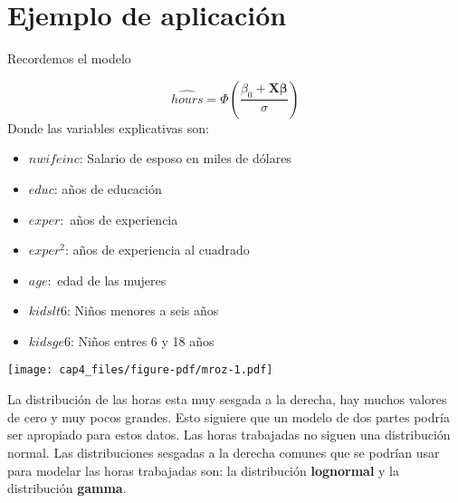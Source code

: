 \documentclass[
  letterpaper,
  DIV=11,
  numbers=noendperiod]{scrreprt}
\newenvironment{Shaded}{\begin{snugshade}}{\end{snugshade}}
\newcommand{\AttributeTok}[1]{\textcolor[rgb]{0.40,0.45,0.13}{#1}}
\newcommand{\CommentTok}[1]{\textcolor[rgb]{0.37,0.37,0.37}{#1}}
\newcommand{\DecValTok}[1]{\textcolor[rgb]{0.68,0.00,0.00}{#1}}
\newcommand{\FunctionTok}[1]{\textcolor[rgb]{0.28,0.35,0.67}{#1}}
\newcommand{\NormalTok}[1]{\textcolor[rgb]{0.00,0.23,0.31}{#1}}
\newcommand{\SpecialCharTok}[1]{\textcolor[rgb]{0.37,0.37,0.37}{#1}}
\newcommand{\StringTok}[1]{\textcolor[rgb]{0.13,0.47,0.30}{#1}}
\begin{document}
\section{Ejemplo de aplicación}\label{ejemplo-de-aplicaciuxf3n}

Recordemos el modelo

\[
\widehat{hours}=\Phi\left(\frac{\beta_0+\mathbf{X\beta}}{\sigma}\right)
\] Donde las variables explicativas son:

\begin{itemize}
\item
  \(nwifeinc\): Salario de esposo en miles de dólares
\item
  \(educ\): años de educación
\item
  \(exper:\) años de experiencia
\item
  \(exper^2\): años de experiencia al cuadrado
\item
  \(age:\) edad de las mujeres
\item
  \(kidslt6\): Niños menores a seis años
\item
  \(kidsge6\): Niños entres 6 y 18 años
\end{itemize}

\begin{Shaded}
\end{Shaded}

\texttt{[image: cap4\_files/figure-pdf/mroz-1.pdf]}

La distribución de las horas esta muy sesgada a la derecha, hay muchos
valores de cero y muy pocos grandes. Esto siguiere que un modelo de dos
partes podría ser apropiado para estos datos. Las horas trabajadas no
siguen una distribución normal. Las distribuciones sesgadas a la derecha
comunes que se podrían usar para modelar las horas trabajadas son: la
distribución \textbf{lognormal} y la distribución \textbf{gamma}.
\end{document}
